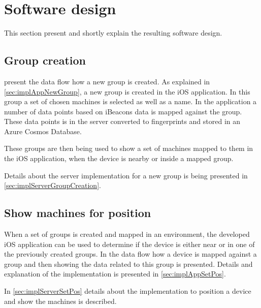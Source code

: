 \section{Software design}\label{sec:resultSoftwareDesign}
This section present and shortly explain the resulting software design.


\subsection{Group creation}\label{sec:resultsSoftwareDesignGroup}

 present the data flow how a new group is created.
As explained in \cref{sec:implAppNewGroup}, a new group is created in the iOS application.
In this group a set of chosen machines is selected as well as a name.
In the application a number of data points based on iBeacons data is mapped against the group.
These data points is in the server converted to fingerprints and stored in an Azure Cosmos Database.

\bigskip

These groups are then being used to show a set of machines mapped to them in the iOS application, when the device is nearby or inside a mapped group.

\bigskip

Details about the server implementation for a new group is being presented in \cref{sec:implServerGroupCreation}.


\subsection{Show machines for position}\label{sec:resultsSoftwareDesignPos}

When a set of groups is created and mapped in an environment, the developed iOS application can be used to determine if the device is either near or in one of the previously created groups.
In  the data flow how a device is mapped against a group and then showing the data related to this group is presented.
Details and explanation of the implementation is presented in \cref{sec:implAppSetPos}.

\bigskip

In \cref{sec:implServerSetPos} details about the implementation to position a device and show the machines is described.

